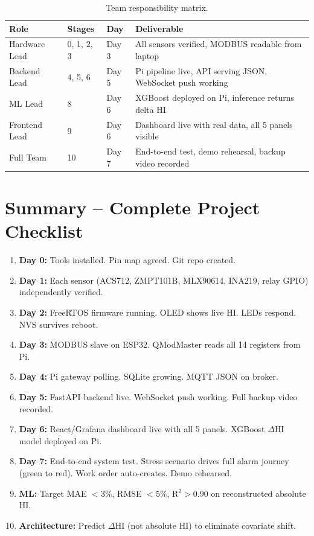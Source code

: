 \documentclass[12pt,a4paper]{article}
\begin{document}
\begin{table}[H]
\centering
\begin{tabularx}{\textwidth}{lllX}
\toprule
\textbf{Role} & \textbf{Stages} & \textbf{Day} & \textbf{Deliverable} \\
\midrule
Hardware Lead   & 0, 1, 2, 3 & Day 3 & All sensors verified, MODBUS readable from laptop \\
Backend Lead    & 4, 5, 6    & Day 5 & Pi pipeline live, API serving JSON, WebSocket push working \\
ML Lead         & 8          & Day 6 & XGBoost deployed on Pi, inference returns delta HI \\
Frontend Lead   & 9          & Day 6 & Dashboard live with real data, all 5 panels visible \\
Full Team       & 10         & Day 7 & End-to-end test, demo rehearsal, backup video recorded \\
\bottomrule
\end{tabularx}
\caption{Team responsibility matrix.}
\end{table}

\section{Summary -- Complete Project Checklist}

\begin{tcolorbox}[colback=notebg,colframe=accent,title={\bfseries RelayGuard -- Complete Build Checklist}]
\begin{enumerate}[noitemsep]
  \item \textbf{Day 0:} Tools installed. Pin map agreed. Git repo created.
  \item \textbf{Day 1:} Each sensor (ACS712, ZMPT101B, MLX90614, INA219, relay GPIO) independently verified.
  \item \textbf{Day 2:} FreeRTOS firmware running. OLED shows live HI. LEDs respond. NVS survives reboot.
  \item \textbf{Day 3:} MODBUS slave on ESP32. QModMaster reads all 14 registers from Pi.
  \item \textbf{Day 4:} Pi gateway polling. SQLite growing. MQTT JSON on broker.
  \item \textbf{Day 5:} FastAPI backend live. WebSocket push working. Full backup video recorded.
  \item \textbf{Day 6:} React/Grafana dashboard live with all 5 panels. XGBoost $\Delta$HI model deployed on Pi.
  \item \textbf{Day 7:} End-to-end system test. Stress scenario drives full alarm journey (green to red). Work order auto-creates. Demo rehearsed.
  \item \textbf{ML:} Target MAE $< 3\%$, RMSE $< 5\%$, R$^2 > 0.90$ on reconstructed absolute HI.
  \item \textbf{Architecture:} Predict $\Delta$HI (not absolute HI) to eliminate covariate shift.
\end{enumerate}
\end{tcolorbox}
\end{document}
